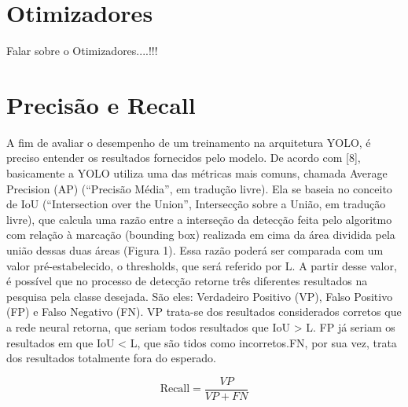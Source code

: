 
\section{Otimizadores}
\label{sec:otimizadores}

Falar sobre o Otimizadores....!!!

\section{Precisão e Recall}
\label{sec:precisaorecall}

A fim de avaliar o desempenho de um treinamento na arquitetura YOLO, é preciso entender os resultados fornecidos pelo modelo. De acordo com [8], basicamente a YOLO utiliza uma das métricas mais comuns, chamada Average Precision (AP) (“Precisão Média”, em tradução livre). Ela se baseia no conceito de IoU (“Intersection over the Union”, Intersecção sobre a União, em tradução livre), que calcula uma razão entre a interseção da detecção feita pelo algoritmo com relação à marcação (bounding box) realizada em cima da área dividida pela união dessas duas áreas (Figura 1). Essa razão poderá ser comparada com um valor pré-estabelecido, o thresholds, que será referido por L. A partir desse valor, é possível que no processo de detecção retorne três diferentes resultados na pesquisa pela classe desejada. São eles: Verdadeiro Positivo (VP), Falso Positivo (FP) e Falso Negativo (FN). VP trata-se dos resultados considerados corretos que a rede neural retorna, que seriam todos resultados que IoU > L. FP já seriam os resultados em que IoU < L, que são tidos como incorretos.FN, por sua vez, trata dos resultados totalmente fora do esperado.

\begin{equation}
    \text{Recall} = \frac{VP}{VP + FN} \tag{1}
    \end{equation}
    
